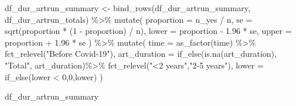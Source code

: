 \documentclass[
  letterpaper,
  DIV=11,
  numbers=noendperiod]{scrartcl}
\newenvironment{Shaded}{\begin{snugshade}}{\end{snugshade}}
\newcommand{\AttributeTok}[1]{\textcolor[rgb]{0.40,0.45,0.13}{#1}}
\newcommand{\DecValTok}[1]{\textcolor[rgb]{0.68,0.00,0.00}{#1}}
\newcommand{\FloatTok}[1]{\textcolor[rgb]{0.68,0.00,0.00}{#1}}
\newcommand{\FunctionTok}[1]{\textcolor[rgb]{0.28,0.35,0.67}{#1}}
\newcommand{\NormalTok}[1]{\textcolor[rgb]{0.00,0.23,0.31}{#1}}
\newcommand{\OtherTok}[1]{\textcolor[rgb]{0.00,0.23,0.31}{#1}}
\newcommand{\SpecialCharTok}[1]{\textcolor[rgb]{0.37,0.37,0.37}{#1}}
\newcommand{\StringTok}[1]{\textcolor[rgb]{0.13,0.47,0.30}{#1}}
\begin{document}
\begin{Shaded}
\begin{Highlighting}[]
\NormalTok{df\_dur\_artrun\_summary }\OtherTok{\textless{}{-}} \FunctionTok{bind\_rows}\NormalTok{(df\_dur\_artrun\_summary, df\_dur\_artrun\_totals) }\SpecialCharTok{\%\textgreater{}\%}
  \FunctionTok{mutate}\NormalTok{(}
    \AttributeTok{proportion =}\NormalTok{ n\_yes }\SpecialCharTok{/}\NormalTok{ n,}
    \AttributeTok{se =} \FunctionTok{sqrt}\NormalTok{(proportion }\SpecialCharTok{*}\NormalTok{ (}\DecValTok{1} \SpecialCharTok{{-}}\NormalTok{ proportion) }\SpecialCharTok{/}\NormalTok{ n),}
    \AttributeTok{lower =}\NormalTok{ proportion }\SpecialCharTok{{-}} \FloatTok{1.96} \SpecialCharTok{*}\NormalTok{ se,}
    \AttributeTok{upper =}\NormalTok{ proportion }\SpecialCharTok{+} \FloatTok{1.96} \SpecialCharTok{*}\NormalTok{ se}
\NormalTok{  ) }\SpecialCharTok{\%\textgreater{}\%} 
  \FunctionTok{mutate}\NormalTok{(}
    \AttributeTok{time =} \FunctionTok{as\_factor}\NormalTok{(time) }\SpecialCharTok{\%\textgreater{}\%} 
      \FunctionTok{fct\_relevel}\NormalTok{(}\StringTok{"Before Covid{-}19"}\NormalTok{),}
    \AttributeTok{art\_duration =} \FunctionTok{if\_else}\NormalTok{(}\FunctionTok{is.na}\NormalTok{(art\_duration), }\StringTok{"Total"}\NormalTok{, art\_duration)}\SpecialCharTok{\%\textgreater{}\%} 
      \FunctionTok{fct\_relevel}\NormalTok{(}\StringTok{"\textless{}2 years"}\NormalTok{,}\StringTok{"2{-}5 years"}\NormalTok{),}
    \AttributeTok{lower =} \FunctionTok{if\_else}\NormalTok{(lower }\SpecialCharTok{\textless{}} \DecValTok{0}\NormalTok{,}\DecValTok{0}\NormalTok{,lower)}
\NormalTok{  )}

\NormalTok{df\_dur\_artrun\_summary}
\end{Highlighting}
\end{Shaded}
\end{document}
